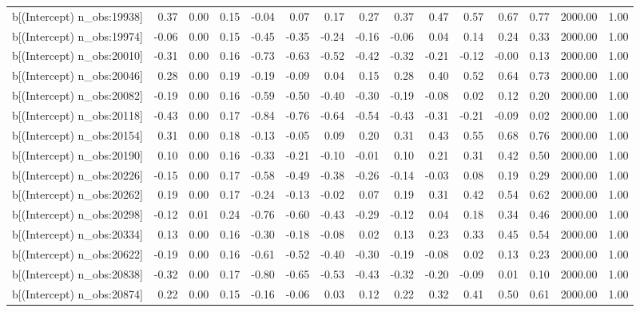 \begin{table}[ht]
\begin{tabular}{rrrrrrrrrrrrrrr}
  b[(Intercept) n\_obs:19938] & 0.37 & 0.00 & 0.15 & -0.04 & 0.07 & 0.17 & 0.27 & 0.37 & 0.47 & 0.57 & 0.67 & 0.77 & 2000.00 & 1.00 \\ 
  b[(Intercept) n\_obs:19974] & -0.06 & 0.00 & 0.15 & -0.45 & -0.35 & -0.24 & -0.16 & -0.06 & 0.04 & 0.14 & 0.24 & 0.33 & 2000.00 & 1.00 \\ 
  b[(Intercept) n\_obs:20010] & -0.31 & 0.00 & 0.16 & -0.73 & -0.63 & -0.52 & -0.42 & -0.32 & -0.21 & -0.12 & -0.00 & 0.13 & 2000.00 & 1.00 \\ 
  b[(Intercept) n\_obs:20046] & 0.28 & 0.00 & 0.19 & -0.19 & -0.09 & 0.04 & 0.15 & 0.28 & 0.40 & 0.52 & 0.64 & 0.73 & 2000.00 & 1.00 \\ 
  b[(Intercept) n\_obs:20082] & -0.19 & 0.00 & 0.16 & -0.59 & -0.50 & -0.40 & -0.30 & -0.19 & -0.08 & 0.02 & 0.12 & 0.20 & 2000.00 & 1.00 \\ 
  b[(Intercept) n\_obs:20118] & -0.43 & 0.00 & 0.17 & -0.84 & -0.76 & -0.64 & -0.54 & -0.43 & -0.31 & -0.21 & -0.09 & 0.02 & 2000.00 & 1.00 \\ 
  b[(Intercept) n\_obs:20154] & 0.31 & 0.00 & 0.18 & -0.13 & -0.05 & 0.09 & 0.20 & 0.31 & 0.43 & 0.55 & 0.68 & 0.76 & 2000.00 & 1.00 \\ 
  b[(Intercept) n\_obs:20190] & 0.10 & 0.00 & 0.16 & -0.33 & -0.21 & -0.10 & -0.01 & 0.10 & 0.21 & 0.31 & 0.42 & 0.50 & 2000.00 & 1.00 \\ 
  b[(Intercept) n\_obs:20226] & -0.15 & 0.00 & 0.17 & -0.58 & -0.49 & -0.38 & -0.26 & -0.14 & -0.03 & 0.08 & 0.19 & 0.29 & 2000.00 & 1.00 \\ 
  b[(Intercept) n\_obs:20262] & 0.19 & 0.00 & 0.17 & -0.24 & -0.13 & -0.02 & 0.07 & 0.19 & 0.31 & 0.42 & 0.54 & 0.62 & 2000.00 & 1.00 \\ 
  b[(Intercept) n\_obs:20298] & -0.12 & 0.01 & 0.24 & -0.76 & -0.60 & -0.43 & -0.29 & -0.12 & 0.04 & 0.18 & 0.34 & 0.46 & 2000.00 & 1.00 \\ 
  b[(Intercept) n\_obs:20334] & 0.13 & 0.00 & 0.16 & -0.30 & -0.18 & -0.08 & 0.02 & 0.13 & 0.23 & 0.33 & 0.45 & 0.54 & 2000.00 & 1.00 \\ 
  b[(Intercept) n\_obs:20622] & -0.19 & 0.00 & 0.16 & -0.61 & -0.52 & -0.40 & -0.30 & -0.19 & -0.08 & 0.02 & 0.13 & 0.23 & 2000.00 & 1.00 \\ 
  b[(Intercept) n\_obs:20838] & -0.32 & 0.00 & 0.17 & -0.80 & -0.65 & -0.53 & -0.43 & -0.32 & -0.20 & -0.09 & 0.01 & 0.10 & 2000.00 & 1.00 \\ 
  b[(Intercept) n\_obs:20874] & 0.22 & 0.00 & 0.15 & -0.16 & -0.06 & 0.03 & 0.12 & 0.22 & 0.32 & 0.41 & 0.50 & 0.61 & 2000.00 & 1.00 \\ 

\end{tabular}
\end{table}

